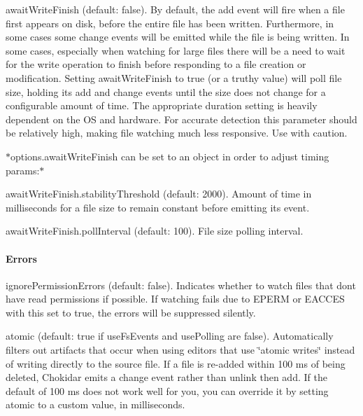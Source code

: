 \begin{DoxyItemize}
\item {\ttfamily await\+Write\+Finish} (default\+: {\ttfamily false}). By default, the {\ttfamily add} event will fire when a file first appears on disk, before the entire file has been written. Furthermore, in some cases some {\ttfamily change} events will be emitted while the file is being written. In some cases, especially when watching for large files there will be a need to wait for the write operation to finish before responding to a file creation or modification. Setting {\ttfamily await\+Write\+Finish} to {\ttfamily true} (or a truthy value) will poll file size, holding its {\ttfamily add} and {\ttfamily change} events until the size does not change for a configurable amount of time. The appropriate duration setting is heavily dependent on the OS and hardware. For accurate detection this parameter should be relatively high, making file watching much less responsive. Use with caution.
\begin{DoxyItemize}
\item $\ast${\ttfamily options.\+await\+Write\+Finish} can be set to an object in order to adjust timing params\+:$\ast$
\item {\ttfamily await\+Write\+Finish.\+stability\+Threshold} (default\+: 2000). Amount of time in milliseconds for a file size to remain constant before emitting its event.
\item {\ttfamily await\+Write\+Finish.\+poll\+Interval} (default\+: 100). File size polling interval.
\end{DoxyItemize}
\end{DoxyItemize}

\paragraph*{Errors}


\begin{DoxyItemize}
\item {\ttfamily ignore\+Permission\+Errors} (default\+: {\ttfamily false}). Indicates whether to watch files that don\textquotesingle{}t have read permissions if possible. If watching fails due to {\ttfamily E\+P\+E\+RM} or {\ttfamily E\+A\+C\+C\+ES} with this set to {\ttfamily true}, the errors will be suppressed silently.
\item {\ttfamily atomic} (default\+: {\ttfamily true} if {\ttfamily use\+Fs\+Events} and {\ttfamily use\+Polling} are {\ttfamily false}). Automatically filters out artifacts that occur when using editors that use \char`\"{}atomic writes\char`\"{} instead of writing directly to the source file. If a file is re-\/added within 100 ms of being deleted, Chokidar emits a {\ttfamily change} event rather than {\ttfamily unlink} then {\ttfamily add}. If the default of 100 ms does not work well for you, you can override it by setting {\ttfamily atomic} to a custom value, in milliseconds.
\end{DoxyItemize}

